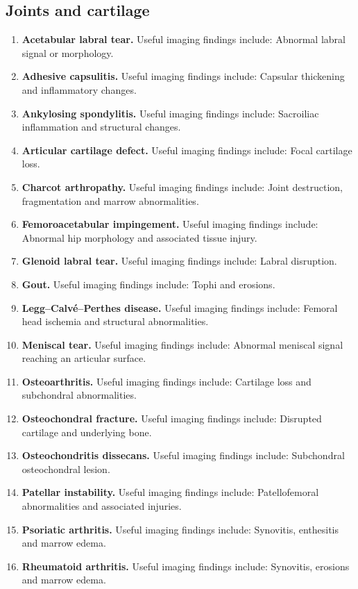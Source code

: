 \subsection{Joints and cartilage}
\begin{enumerate}[leftmargin=*,itemsep=0.45em,topsep=0.4em]
\item \textbf{Acetabular labral tear.} Useful imaging findings include: Abnormal labral signal or morphology.
\item \textbf{Adhesive capsulitis.} Useful imaging findings include: Capsular thickening and inflammatory changes.
\item \textbf{Ankylosing spondylitis.} Useful imaging findings include: Sacroiliac inflammation and structural changes.
\item \textbf{Articular cartilage defect.} Useful imaging findings include: Focal cartilage loss.
\item \textbf{Charcot arthropathy.} Useful imaging findings include: Joint destruction, fragmentation and marrow abnormalities.
\item \textbf{Femoroacetabular impingement.} Useful imaging findings include: Abnormal hip morphology and associated tissue injury.
\item \textbf{Glenoid labral tear.} Useful imaging findings include: Labral disruption.
\item \textbf{Gout.} Useful imaging findings include: Tophi and erosions.
\item \textbf{Legg--Calvé--Perthes disease.} Useful imaging findings include: Femoral head ischemia and structural abnormalities.
\item \textbf{Meniscal tear.} Useful imaging findings include: Abnormal meniscal signal reaching an articular surface.
\item \textbf{Osteoarthritis.} Useful imaging findings include: Cartilage loss and subchondral abnormalities.
\item \textbf{Osteochondral fracture.} Useful imaging findings include: Disrupted cartilage and underlying bone.
\item \textbf{Osteochondritis dissecans.} Useful imaging findings include: Subchondral osteochondral lesion.
\item \textbf{Patellar instability.} Useful imaging findings include: Patellofemoral abnormalities and associated injuries.
\item \textbf{Psoriatic arthritis.} Useful imaging findings include: Synovitis, enthesitis and marrow edema.
\item \textbf{Rheumatoid arthritis.} Useful imaging findings include: Synovitis, erosions and marrow edema.

\end{enumerate}

